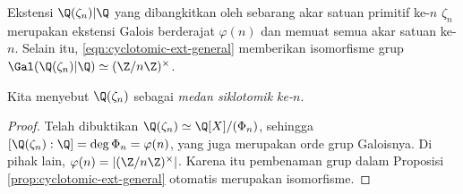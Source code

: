 \begin{theorem}\label{prop:cyclotomic-Galois}
	Ekstensi $\Q(\zeta_n)|\Q$ yang dibangkitkan oleh sebarang akar satuan primitif ke-$n$ $\zeta_n$ merupakan ekstensi Galois berderajat $\varphi(n)$ dan memuat semua akar satuan ke-$n$. Selain itu, \eqref{eqn:cyclotomic-ext-general} memberikan isomorfisme grup $\Gal(\Q(\zeta_n)|\Q)\simeq(\Z/n\Z)^\times$.
\end{theorem}
Kita menyebut $\Q(\zeta_n)$ sebagai \emph{medan siklotomik ke-$n$}. 
\begin{proof}
	Telah dibuktikan $\Q(\zeta_n)\simeq\Q[X]/(\Phi_n)$, sehingga $[\Q(\zeta_n):\Q]=\deg\Phi_n=\varphi(n)$, yang juga merupakan orde grup Galoisnya. Di pihak lain, $\varphi(n)=|(\Z/n\Z)^\times|$. Karena itu pembenaman grup dalam Proposisi \ref{prop:cyclotomic-ext-general} otomatis merupakan isomorfisme.
\end{proof}

